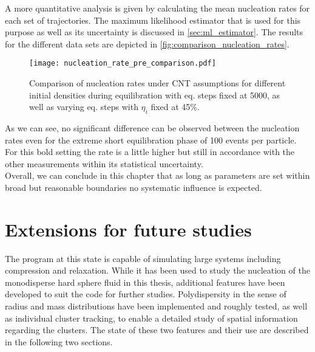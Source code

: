 A more quantitative analysis is given by calculating the mean nucleation rates for each set of trajectories. The maximum likelihood estimator that is used for this purpose as well as its uncertainty is discussed in \autoref{sec:ml_estimator}. The results for the different data sets are depicted in \autoref{fig:comparison_nucleation_rates}.

\begin{figure}[h!]
\centering
\texttt{[image: nucleation\_rate\_pre\_comparison.pdf]}
\caption[Nucleation rates of equilibration test measurements]{Comparison of nucleation rates under CNT assumptions for different initial densities during equilibration with eq. steps fixed at 5000, as well as varying eq. steps with $\eta_i$ fixed at 45\%. }
\label{fig:comparison_nucleation_rates}
\end{figure}

As we can see, no significant difference can be observed between the nucleation rates even for the extreme short equilibration phase of 100 events per particle. For this bold setting the rate is a little higher but still in accordance with the other measurements within its statistical uncertainty.\\

Overall, we can conclude in this chapter that as long as parameters are set within broad but reasonable boundaries no systematic influence is expected. 

\section{Extensions for future studies}
\label{sec:simulation_ext}
The program at this state is capable of simulating large systems including compression and relaxation. While it has been used to study the nucleation of the monodisperse hard sphere fluid in this thesis, additional features have been developed to suit the code for further studies. Polydispersity in the sense of radius and mass distributions have been implemented and roughly tested, as well as individual cluster tracking, to enable a detailed study of spatial information regarding the clusters. The state of these two features and their use are described in the following two sections.

